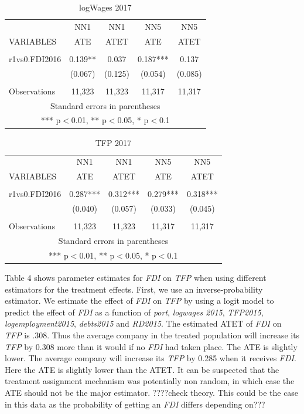 \documentclass[a4paper,12pt]{scrartcl}
\begin{document}
\begin{table}[htbp]\centering
\caption{logWages 2017}
\begin{tabular}{lcccc} \hline
 & NN1 & NN1 & NN5 & NN5 \\
VARIABLES & ATE & ATET & ATE & ATET\\ \hline
 &  &  &  &  \\
r1vs0.FDI2016 & 0.139** & 0.037 & 0.187*** & 0.137 \\
 & (0.067) & (0.125) & (0.054) & (0.085) \\
 &  &  &  &  \\
 Observations & 11,323 & 11,323 & 11,317 & 11,317 \\ \hline
\multicolumn{5}{c}{ Standard errors in parentheses} \\
\multicolumn{5}{c}{ *** p$<$0.01, ** p$<$0.05, * p$<$0.1} \\
\end{tabular}
\end{table}

\begin{table}[htbp]\centering
\caption{TFP 2017}
\begin{tabular}{lcccc} \hline
 & NN1 & NN1 & NN5 & NN5 \\
VARIABLES & ATE & ATET & ATE & ATET \\ \hline
 &  &  &  &  \\
r1vs0.FDI2016 & 0.287*** & 0.312*** & 0.279*** & 0.318*** \\
 & (0.040) & (0.057) & (0.033) & (0.045) \\
 &  &  &  &  \\
 Observations & 11,323 & 11,323 & 11,317 & 11,317 \\ \hline
\multicolumn{5}{c}{ Standard errors in parentheses} \\
\multicolumn{5}{c}{ *** p$<$0.01, ** p$<$0.05, * p$<$0.1} \\
\end{tabular}
\end{table}

\newpage
Table 4 shows parameter estimates for \textit{FDI}  on  \textit{TFP} when using different  estimators for the treatment effects. First, we use an inverse-probability estimator. We estimate the effect of \textit{FDI}  on \textit{TFP} by using a logit model to predict the effect of \textit{FDI} as a function of \textit{port}, \textit{logwages 2015}, \textit{TFP2015}, \textit{logemployment2015}, \textit{debts2015} and \textit{RD2015}. The estimated ATET of \textit{FDI}  on \textit{TFP} is .308. Thus the average company in the treated population will increase its \textit{TFP} by 0.308  more than it would if no \textit{FDI}  had taken place. The ATE is slightly lower. The average company will increase its \textit{TFP} by 0.285 when it receives \textit{FDI}. Here the ATE is slightly lower than the ATET. It can be suspected that the treatment assignment mechanism was potentially non random, in which case the ATE should not be the major estimator. ????check theory. This could be the case in this data as the probability of getting an \textit{FDI}  differs depending on???
\end{document}
